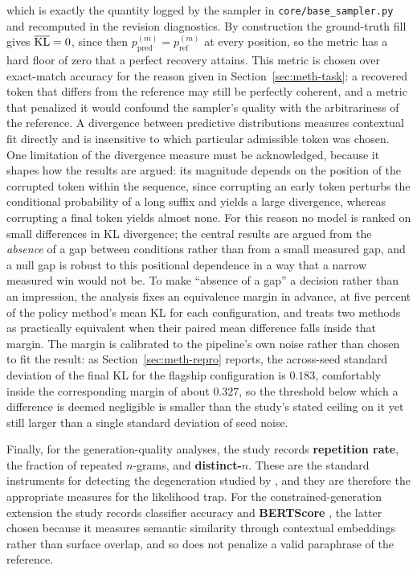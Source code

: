which is exactly the quantity logged by the sampler in \texttt{core/base\_sampler.py} and recomputed in the revision diagnostics. By construction the ground-truth fill gives $\overline{\operatorname{KL}} = 0$, since then $p^{(m)}_{\text{pred}} = p^{(m)}_{\text{ref}}$ at every position, so the metric has a hard floor of zero that a perfect recovery attains. This metric is chosen over exact-match accuracy for the reason given in Section~\ref{sec:meth-task}: a recovered token that differs from the reference may still be perfectly coherent, and a metric that penalized it would confound the sampler's quality with the arbitrariness of the reference. A divergence between predictive distributions measures contextual fit directly and is insensitive to which particular admissible token was chosen. One limitation of the divergence measure must be acknowledged, because it shapes how the results are argued: its magnitude depends on the position of the corrupted token within the sequence, since corrupting an early token perturbs the conditional probability of a long suffix and yields a large divergence, whereas corrupting a final token yields almost none. For this reason no model is ranked on small differences in KL divergence; the central results are argued from the \emph{absence} of a gap between conditions rather than from a small measured gap, and a null gap is robust to this positional dependence in a way that a narrow measured win would not be. To make ``absence of a gap'' a decision rather than an impression, the analysis fixes an equivalence margin in advance, at five percent of the policy method's mean KL for each configuration, and treats two methods as practically equivalent when their paired mean difference falls inside that margin. The margin is calibrated to the pipeline's own noise rather than chosen to fit the result: as Section~\ref{sec:meth-repro} reports, the across-seed standard deviation of the final KL for the flagship configuration is $0.183$, comfortably inside the corresponding margin of about $0.327$, so the threshold below which a difference is deemed negligible is smaller than the study's stated ceiling on it yet still larger than a single standard deviation of seed noise.

Finally, for the generation-quality analyses, the study records \textbf{repetition rate}, the fraction of repeated $n$-grams, and \textbf{distinct-$n$}. These are the standard instruments for detecting the degeneration studied by \citet{holtzman2020curious}, and they are therefore the appropriate measures for the likelihood trap. For the constrained-generation extension the study records classifier accuracy and \textbf{BERTScore} \citep{zhang2020bertscore}, the latter chosen because it measures semantic similarity through contextual embeddings rather than surface overlap, and so does not penalize a valid paraphrase of the reference.

